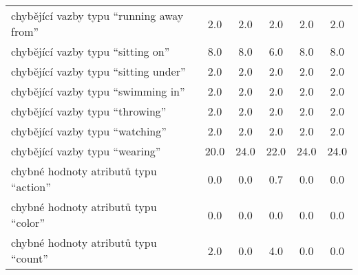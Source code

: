 \begin{table}[ht!]
\begin{tabular}{|l|c|c|c|c|c|}
		chybějící vazby typu \enquote{running away from}    & 2.0                                         & 2.0        & 2.0        & 2.0        & 2.0        \\
		chybějící vazby typu \enquote{sitting on}           & 8.0                                         & 8.0        & 6.0        & 8.0        & 8.0        \\
		chybějící vazby typu \enquote{sitting under}        & 2.0                                         & 2.0        & 2.0        & 2.0        & 2.0        \\
		chybějící vazby typu \enquote{swimming in}          & 2.0                                         & 2.0        & 2.0        & 2.0        & 2.0        \\
		chybějící vazby typu \enquote{throwing}             & 2.0                                         & 2.0        & 2.0        & 2.0        & 2.0        \\
		chybějící vazby typu \enquote{watching}             & 2.0                                         & 2.0        & 2.0        & 2.0        & 2.0        \\
		chybějící vazby typu \enquote{wearing}              & 20.0                                        & 24.0       & 22.0       & 24.0       & 24.0       \\
		\hline
		chybné hodnoty atributů typu \enquote{action}       & 0.0                                         & 0.0        & 0.7        & 0.0        & 0.0        \\
		chybné hodnoty atributů typu \enquote{color}        & 0.0                                         & 0.0        & 0.0        & 0.0        & 0.0        \\
		chybné hodnoty atributů typu \enquote{count}        & 2.0                                         & 0.0        & 4.0        & 0.0        & 0.0        \\

\end{tabular}
\end{table}
